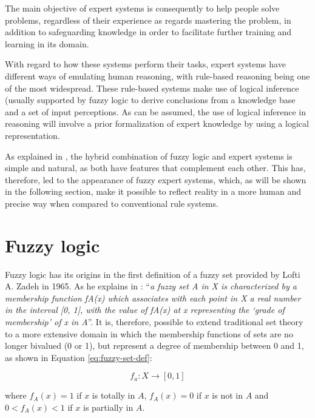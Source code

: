 The main objective of expert systems is consequently to help people solve problems, regardless of their experience as regards mastering the problem, in addition to safeguarding knowledge in order to facilitate further training and learning in its domain.

With regard to how these systems perform their tasks, expert systems have different ways of emulating human reasoning, with rule-based reasoning being one of the most widespread. These rule-based systems make use of logical inference (usually supported by fuzzy logic \cite{negoita_expert_1985, kandel_fuzzy_1991} to derive conclusions from a knowledge base and a set of input perceptions. As can be assumed, the use of logical inference in reasoning will involve a prior formalization of expert knowledge by using a logical representation.

As explained in \cite{medsker_fuzzy_1995}, the hybrid combination of fuzzy logic and expert systems is simple and natural, as both have features that complement each other. This has, therefore, led to the appearance of fuzzy expert systems, which, as will be shown in the following section, make it possible to reflect reality in a more human and precise way when compared to conventional rule systems.

\section{Fuzzy logic}

Fuzzy logic has its origins in the first definition of a fuzzy set provided by Lofti A. Zadeh in 1965. As he explains in \cite[p.~339]{zadeh_fuzzy_1965}: “\emph{a fuzzy set A in X is characterized by a membership function fA(x) which associates with each point in X a real number in the interval [0, 1], with the value of fA(x) at x representing the ‘grade of membership’ of x in A}”. It is, therefore, possible to extend traditional set theory to a more extensive domain in which the membership functions of sets are no longer bivalued (0 or 1), but represent a degree of membership between 0 and 1, as shown in Equation \ref{eq:fuzzy-set-def}:

\begin{equation}
\label{eq:fuzzy-set-def}
f_a: X \rightarrow [0,1]
\end{equation}

where $f_A (x) = 1$ if $x$ is totally in $A$, $f_A (x) = 0$ if $x$ is not in $A$ and $0<f_A (x)<1$ if $x$ is partially in $A$.

